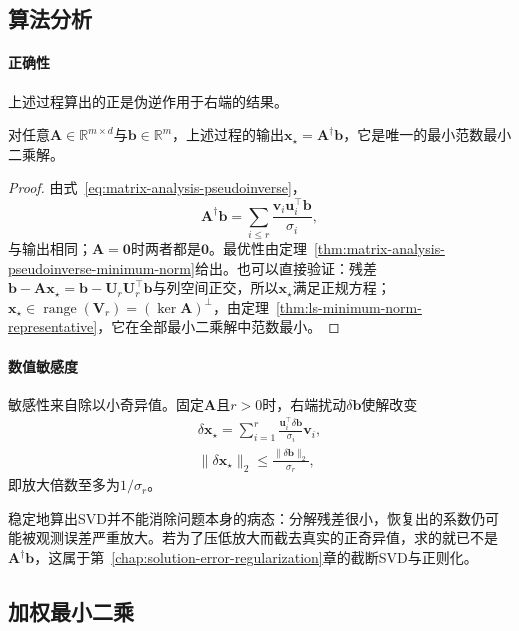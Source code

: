 \subsection{算法分析}

\paragraph{正确性}
上述过程算出的正是伪逆作用于右端的结果。

\begin{theorem}
\label{thm:ls-svd-solve}
对任意$\bm A\in\mathbb R^{m\times d}$与$\bm b\in\mathbb R^m$，上述过程的输出$\bm x_\star=\bm A^\dagger\bm b$，它是唯一的最小范数最小二乘解。
\end{theorem}
\begin{proof}
由式~\eqref{eq:matrix-analysis-pseudoinverse}，
\[
 \bm A^\dagger\bm b=\sum_{i\leq r}\frac{\bm v_i\bm u_i^\top\bm b}{\sigma_i},
\]
与输出相同；$\bm A=\bm0$时两者都是$\bm0$。最优性由定理~\ref{thm:matrix-analysis-pseudoinverse-minimum-norm}给出。也可以直接验证：残差$\bm b-\bm A\bm x_\star=\bm b-\bm U_r\bm U_r^\top\bm b$与列空间正交，所以$\bm x_\star$满足正规方程；$\bm x_\star\in\operatorname{range}(\bm V_r)=(\ker\bm A)^\perp$，由定理~\ref{thm:ls-minimum-norm-representative}，它在全部最小二乘解中范数最小。
\end{proof}

\paragraph{数值敏感度}
敏感性来自除以小奇异值。固定$\bm A$且$r>0$时，右端扰动$\delta\bm b$使解改变
\begin{equation}
 \begin{gathered}
 \delta\bm x_\star=\sum_{i=1}^r\frac{\bm u_i^\top\delta\bm b}{\sigma_i}\bm v_i,\\
 \lVert\delta\bm x_\star\rVert_2\leq\frac{\lVert\delta\bm b\rVert_2}{\sigma_r},
 \end{gathered}
 \label{eq:ls-svd-perturbation-bound}
\end{equation}
即放大倍数至多为$1/\sigma_r$。

稳定地算出SVD并不能消除问题本身的病态：分解残差很小，恢复出的系数仍可能被观测误差严重放大。若为了压低放大而截去真实的正奇异值，求的就已不是$\bm A^\dagger\bm b$，这属于第~\ref{chap:solution-error-regularization}章的截断SVD与正则化。

\subsection{加权最小二乘}
\label{sec:ls-weighted-svd-solve}


